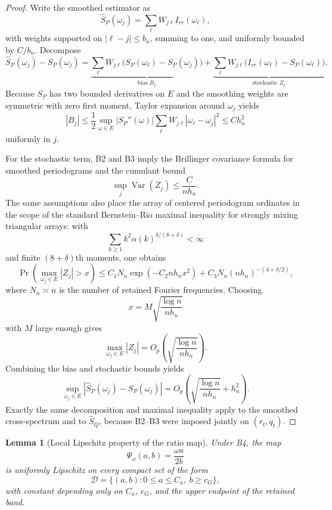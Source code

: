 \documentclass[11pt]{article}
\newtheorem{lemma}[theorem]{Lemma}
\newcommand{\Var}{\operatorname{Var}}
\newcommand{\REV}{}
\begin{document}
\begin{proof}
\REV
Write the smoothed estimator as
\[
  \widehat S_P(\omega_j)=\sum_{\ell}W_{j\ell}I_{rr}(\omega_\ell),
\]
with weights supported on $|\ell-j|\le b_n$, summing to one, and uniformly bounded by $C/b_n$. Decompose
\[
  \widehat S_P(\omega_j)-S_P(\omega_j)
  =
  \underbrace{\sum_{\ell}W_{j\ell}\big(S_P(\omega_\ell)-S_P(\omega_j)\big)}_{\text{bias }B_j}
  +
  \underbrace{\sum_{\ell}W_{j\ell}\big(I_{rr}(\omega_\ell)-S_P(\omega_\ell)\big)}_{\text{stochastic }Z_j}.
\]
Because $S_P$ has two bounded derivatives on $E$ and the smoothing weights are symmetric with zero first moment, Taylor expansion around $\omega_j$ yields
\[
  |B_j|
  \le
  \frac{1}{2}\sup_{\omega\in E}|S_P''(\omega)|\sum_{\ell}W_{j\ell}|\omega_\ell-\omega_j|^2
  \le
  C h_n^2
\]
uniformly in $j$.

For the stochastic term, B2 and B3 imply the Brillinger covariance formula
for smoothed periodograms and the cumulant bound
\[
  \sup_j \Var(Z_j)\le \frac{C}{n h_n}.
\]
The same assumptions also place the array of centered periodogram ordinates in the scope of the standard Bernstein--Rio maximal inequality for strongly mixing triangular arrays: with
\[
  \sum_{k\ge 1} k^2\alpha(k)^{\delta/(8+\delta)}<\infty
\]
and finite $(8+\delta)$th moments, one obtains
\[
  \Pr\!\left(\max_{\omega_j\in E}|Z_j|>x\right)
  \le
  C_1 N_n \exp\!\left(-C_2 n h_n x^2\right)+C_3 N_n (n h_n)^{-(4+\delta/2)},
\]
where $N_n\asymp n$ is the number of retained Fourier frequencies. Choosing
\[
  x=M\sqrt{\frac{\log n}{n h_n}}
\]
with $M$ large enough gives
\[
  \max_{\omega_j\in E}|Z_j|=O_p\!\left(\sqrt{\frac{\log n}{n h_n}}\right).
\]
Combining the bias and stochastic bounds yields
\[
  \sup_{\omega_j\in E}|\widehat S_P(\omega_j)-S_P(\omega_j)|
  =
  O_p\!\left(\sqrt{\frac{\log n}{n h_n}}+h_n^2\right).
\]
Exactly the same decomposition and maximal inequality apply to the smoothed cross-spectrum and to $\widehat S_Q$, because B2--B3 were imposed jointly on $(r_t,q_t)$.
\end{proof}

\begin{lemma}[Local Lipschitz property of the ratio map]\label{lem:ratio-lipschitz}\REV
Under B4, the map
\[
  \Psi_\omega(a,b)=\frac{\omega a}{2b}
\]
is uniformly Lipschitz on every compact set of the form
\[
  \mathcal D=\{(a,b):0\le a\le C_a,\ b\ge c_G\},
\]
with constant depending only on $C_a$, $c_G$, and the upper endpoint of the retained band.
\end{lemma}
\end{document}
